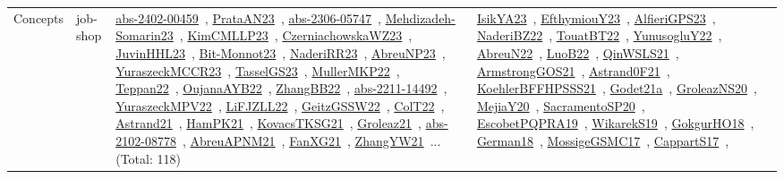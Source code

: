 {\begin{longtable}{lp{3cm}>{\raggedright\arraybackslash}p{6cm}>{\raggedright\arraybackslash}p{6cm}>{\raggedright\arraybackslash}p{8cm}}
Concepts & job-shop & \href{works/abs-2402-00459.pdf}{abs-2402-00459}~\cite{abs-2402-00459}, \href{works/PrataAN23.pdf}{PrataAN23}~\cite{PrataAN23}, \href{works/abs-2306-05747.pdf}{abs-2306-05747}~\cite{abs-2306-05747}, \href{works/Mehdizadeh-Somarin23.pdf}{Mehdizadeh-Somarin23}~\cite{Mehdizadeh-Somarin23}, \href{works/KimCMLLP23.pdf}{KimCMLLP23}~\cite{KimCMLLP23}, \href{works/CzerniachowskaWZ23.pdf}{CzerniachowskaWZ23}~\cite{CzerniachowskaWZ23}, \href{works/JuvinHHL23.pdf}{JuvinHHL23}~\cite{JuvinHHL23}, \href{works/Bit-Monnot23.pdf}{Bit-Monnot23}~\cite{Bit-Monnot23}, \href{works/NaderiRR23.pdf}{NaderiRR23}~\cite{NaderiRR23}, \href{works/AbreuNP23.pdf}{AbreuNP23}~\cite{AbreuNP23}, \href{works/YuraszeckMCCR23.pdf}{YuraszeckMCCR23}~\cite{YuraszeckMCCR23}, \href{works/TasselGS23.pdf}{TasselGS23}~\cite{TasselGS23}, \href{works/MullerMKP22.pdf}{MullerMKP22}~\cite{MullerMKP22}, \href{works/Teppan22.pdf}{Teppan22}~\cite{Teppan22}, \href{works/OujanaAYB22.pdf}{OujanaAYB22}~\cite{OujanaAYB22}, \href{works/ZhangBB22.pdf}{ZhangBB22}~\cite{ZhangBB22}, \href{works/abs-2211-14492.pdf}{abs-2211-14492}~\cite{abs-2211-14492}, \href{works/YuraszeckMPV22.pdf}{YuraszeckMPV22}~\cite{YuraszeckMPV22}, \href{works/LiFJZLL22.pdf}{LiFJZLL22}~\cite{LiFJZLL22}, \href{works/GeitzGSSW22.pdf}{GeitzGSSW22}~\cite{GeitzGSSW22}, \href{works/ColT22.pdf}{ColT22}~\cite{ColT22}, \href{works/Astrand21.pdf}{Astrand21}~\cite{Astrand21}, \href{works/HamPK21.pdf}{HamPK21}~\cite{HamPK21}, \href{works/KovacsTKSG21.pdf}{KovacsTKSG21}~\cite{KovacsTKSG21}, \href{works/Groleaz21.pdf}{Groleaz21}~\cite{Groleaz21}, \href{works/abs-2102-08778.pdf}{abs-2102-08778}~\cite{abs-2102-08778}, \href{works/AbreuAPNM21.pdf}{AbreuAPNM21}~\cite{AbreuAPNM21}, \href{works/FanXG21.pdf}{FanXG21}~\cite{FanXG21}, \href{works/ZhangYW21.pdf}{ZhangYW21}~\cite{ZhangYW21}... (Total: 118) & \href{works/IsikYA23.pdf}{IsikYA23}~\cite{IsikYA23}, \href{works/EfthymiouY23.pdf}{EfthymiouY23}~\cite{EfthymiouY23}, \href{works/AlfieriGPS23.pdf}{AlfieriGPS23}~\cite{AlfieriGPS23}, \href{works/NaderiBZ22.pdf}{NaderiBZ22}~\cite{NaderiBZ22}, \href{works/TouatBT22.pdf}{TouatBT22}~\cite{TouatBT22}, \href{works/YunusogluY22.pdf}{YunusogluY22}~\cite{YunusogluY22}, \href{works/AbreuN22.pdf}{AbreuN22}~\cite{AbreuN22}, \href{works/LuoB22.pdf}{LuoB22}~\cite{LuoB22}, \href{works/QinWSLS21.pdf}{QinWSLS21}~\cite{QinWSLS21}, \href{works/ArmstrongGOS21.pdf}{ArmstrongGOS21}~\cite{ArmstrongGOS21}, \href{works/Astrand0F21.pdf}{Astrand0F21}~\cite{Astrand0F21}, \href{works/KoehlerBFFHPSSS21.pdf}{KoehlerBFFHPSSS21}~\cite{KoehlerBFFHPSSS21}, \href{works/Godet21a.pdf}{Godet21a}~\cite{Godet21a}, \href{works/GroleazNS20.pdf}{GroleazNS20}~\cite{GroleazNS20}, \href{works/MejiaY20.pdf}{MejiaY20}~\cite{MejiaY20}, \href{works/SacramentoSP20.pdf}{SacramentoSP20}~\cite{SacramentoSP20}, \href{works/EscobetPQPRA19.pdf}{EscobetPQPRA19}~\cite{EscobetPQPRA19}, \href{works/WikarekS19.pdf}{WikarekS19}~\cite{WikarekS19}, \href{works/GokgurHO18.pdf}{GokgurHO18}~\cite{GokgurHO18}, \href{works/German18.pdf}{German18}~\cite{German18}, \href{works/MossigeGSMC17.pdf}{MossigeGSMC17}~\cite{MossigeGSMC17}, \href{works/CappartS17.pdf}{CappartS17}~\cite{CappartS17}, 
\end{longtable}}
